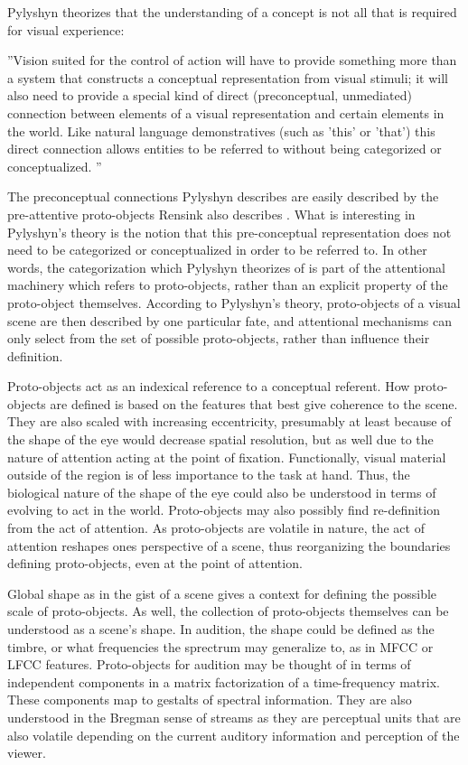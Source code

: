 \documentclass[a4paper,10pt,final]{ThesisStyle}
\begin{document}
Pylyshyn theorizes that the understanding of a concept is not all that is required for visual experience: 
\begin{quotationb}
''Vision suited for the control of action will have to provide something more than a system that constructs a conceptual representation from visual stimuli; it will also need to provide a special kind of direct (preconceptual, unmediated) connection between elements of a visual representation and certain elements in the world. Like natural language demonstratives (such as 'this' or 'that') this direct connection allows entities to be referred to without being categorized or conceptualized. \cite{Pylyshyn2001}''
\end{quotationb}  
The preconceptual connections Pylyshyn describes are easily described by the pre-attentive proto-objects Rensink also describes \cite{Rensink2000,Rensink2001}.  What is interesting in Pylyshyn's theory is the notion that this pre-conceptual representation does not need to be categorized or conceptualized in order to be referred to.  In other words, the categorization which Pylyshyn theorizes of is part of the attentional machinery which refers to proto-objects, rather than an explicit property of the proto-object themselves.  According to Pylyshyn's theory, proto-objects of a visual scene are then described by one particular fate, and attentional mechanisms can only select from the set of possible proto-objects, rather than influence their definition. 

Proto-objects act as an indexical reference to a conceptual referent.  How proto-objects are defined is based on the features that best give coherence to the scene.  They are also scaled with increasing eccentricity, presumably at least because of the shape of the eye would decrease spatial resolution, but as well due to the nature of attention acting at the point of fixation.  Functionally, visual material outside of the region is of less importance to the task at hand.  Thus, the biological nature of the shape of the eye could also be understood in terms of evolving to act in the world.  Proto-objects may also possibly find re-definition from the act of attention.  As proto-objects are volatile in nature, the act of attention reshapes ones perspective of a scene, thus reorganizing the boundaries defining proto-objects, even at the point of attention.

Global shape as in the gist of a scene gives a context for defining the possible scale of proto-objects.  As well, the collection of proto-objects themselves can be understood as a scene's shape.  In audition, the shape could be defined as the timbre, or what frequencies the sprectrum may generalize to, as in MFCC or LFCC features.  Proto-objects for audition may be thought of in terms of independent components in a matrix factorization of a time-frequency matrix.  These components map to gestalts of spectral information.  They are also understood in the Bregman sense of streams as they are perceptual units that are also volatile depending on the current auditory information and perception of the viewer.
\end{document}

